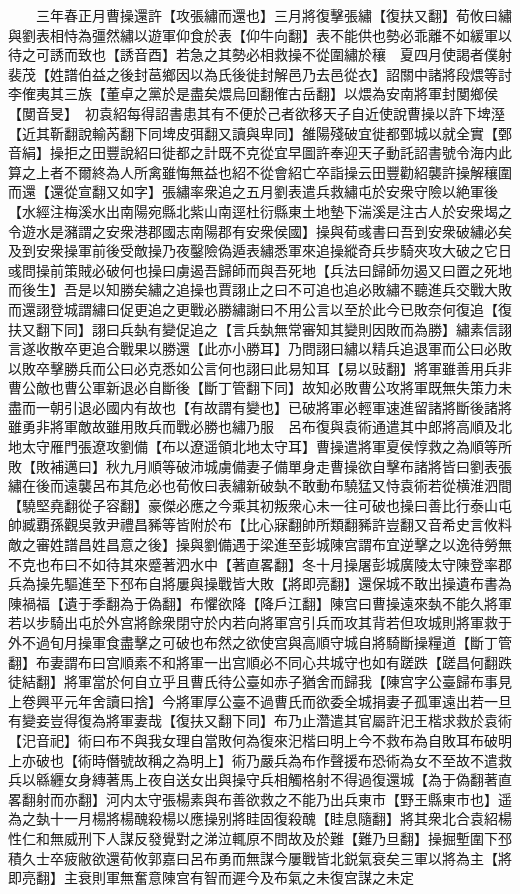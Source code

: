 　　三年春正月曹操還許【攻張繡而還也】三月將復擊張繡【復扶又翻】荀攸曰繡與劉表相恃為彊然繡以遊軍仰食於表【仰牛向翻】表不能供也勢必乖離不如緩軍以待之可誘而致也【誘音酉】若急之其勢必相救操不從圍繡於穰　夏四月使謁者僕射裴茂【姓譜伯益之後封䓃鄉因以為氏後徙封解邑乃去邑從衣】詔關中諸將段煨等討李傕夷其三族【董卓之黨於是盡矣煨烏回翻傕古岳翻】以煨為安南將軍封閺鄉侯【閺音旻】　初袁紹每得詔書患其有不便於己者欲移天子自近使說曹操以許下埤溼【近其靳翻說輸芮翻下同埤皮弭翻又讀與卑同】雒陽殘破宜徙都鄄城以就全實【鄄音絹】操拒之田豐說紹曰徙都之計既不克從宜早圖許奉迎天子動託詔書號令海内此算之上者不爾終為人所禽雖悔無益也紹不從會紹亡卒詣操云田豐勸紹襲許操解穰圍而還【還從宣翻又如字】張繡率衆追之五月劉表遣兵救繡屯於安衆守險以絶軍後【水經注梅溪水出南陽宛縣北紫山南逕杜衍縣東土地墊下湍溪是注古人於安衆堨之令遊水是瀦謂之安衆港郡國志南陽郡有安衆侯國】操與荀彧書曰吾到安衆破繡必矣及到安衆操軍前後受敵操乃夜鑿險偽遁表繡悉軍來追操縱奇兵步騎夾攻大破之它日彧問操前策賊必破何也操曰虜遏吾歸師而與吾死地【兵法曰歸師勿遏又曰置之死地而後生】吾是以知勝矣繡之追操也賈詡止之曰不可追也追必敗繡不聽進兵交戰大敗而還詡登城謂繡曰促更追之更戰必勝繡謝曰不用公言以至於此今已敗奈何復追【復扶又翻下同】詡曰兵埶有變促追之【言兵埶無常審知其變則因敗而為勝】繡素信詡言遂收散卒更追合戰果以勝還【此亦小勝耳】乃問詡曰繡以精兵追退軍而公曰必敗以敗卒擊勝兵而公曰必克悉如公言何也詡曰此易知耳【易以䜴翻】將軍雖善用兵非曹公敵也曹公軍新退必自斷後【斷丁管翻下同】故知必敗曹公攻將軍既無失策力未盡而一朝引退必國内有故也【有故謂有變也】已破將軍必輕軍速進留諸將斷後諸將雖勇非將軍敵故雖用敗兵而戰必勝也繡乃服　呂布復與袁術通遣其中郎將高順及北地太守雁門張遼攻劉備【布以遼遥領北地太守耳】曹操遣將軍夏侯惇救之為順等所敗【敗補邁曰】秋九月順等破沛城虜備妻子備單身走曹操欲自擊布諸將皆曰劉表張繡在後而遠襲呂布其危必也荀攸曰表繡新破埶不敢動布驍猛又恃袁術若從横淮泗間【驍堅堯翻從子容翻】豪傑必應之今乘其初叛衆心未一往可破也操曰善比行泰山屯帥臧覇孫觀吳敦尹禮昌豨等皆附於布【比心寐翻帥所類翻豨許豈翻又音希史言攸料敵之審姓譜昌姓昌意之後】操與劉備遇于梁進至彭城陳宫謂布宜逆擊之以逸待勞無不克也布曰不如待其來蹙著泗水中【著直畧翻】冬十月操屠彭城廣陵太守陳登率郡兵為操先驅進至下邳布自將屢與操戰皆大敗【將即亮翻】還保城不敢出操遺布書為陳禍福【遺于季翻為于偽翻】布懼欲降【降戶江翻】陳宫曰曹操遠來埶不能久將軍若以步騎出屯於外宫將餘衆閉守於内若向將軍宫引兵而攻其背若但攻城則將軍救于外不過旬月操軍食盡擊之可破也布然之欲使宫與高順守城自將騎斷操糧道【斷丁管翻】布妻謂布曰宫順素不和將軍一出宫順必不同心共城守也如有蹉跌【蹉昌何翻跌徒結翻】將軍當於何自立乎且曹氏待公臺如赤子猶舍而歸我【陳宫字公臺歸布事見上卷興平元年舍讀曰捨】今將軍厚公臺不過曹氏而欲委全城捐妻子孤軍遠出若一旦有變妾豈得復為將軍妻哉【復扶又翻下同】布乃止濳遣其官屬許汜王楷求救於袁術【汜音祀】術曰布不與我女理自當敗何為復來汜楷曰明上今不救布為自敗耳布破明上亦破也【術時僭號故稱之為明上】術乃嚴兵為布作聲援布恐術為女不至故不遣救兵以緜纒女身縳著馬上夜自送女出與操守兵相觸格射不得過復還城【為于偽翻著直畧翻射而亦翻】河内太守張楊素與布善欲救之不能乃出兵東市【野王縣東市也】遥為之埶十一月楊將楊醜殺楊以應操别將眭固復殺醜【眭息隨翻】將其衆北合袁紹楊性仁和無威刑下人謀反發覺對之涕泣輒原不問故及於難【難乃旦翻】操掘塹圍下邳積久士卒疲敝欲還荀攸郭嘉曰呂布勇而無謀今屢戰皆北鋭氣衰矣三軍以將為主【將即亮翻】主衰則軍無奮意陳宫有智而遲今及布氣之未復宫謀之未定